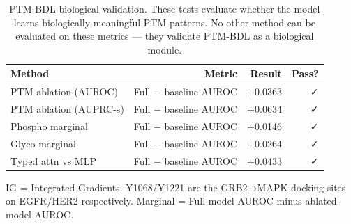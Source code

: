 \begin{table}[htbp]
\centering
\caption{PTM-BDL biological validation. These tests evaluate whether the model learns biologically meaningful PTM patterns. No other method can be evaluated on these metrics — they validate PTM-BDL as a biological module.}
\label{tab:biological}
\small
\begin{tabular}{lrrr}
\toprule
\textbf{Method} & \textbf{Metric} & \textbf{Result} & \textbf{Pass?} \\
\midrule
PTM ablation (AUROC) & Full − baseline AUROC & +0.0363 & ✓ \\
PTM ablation (AUPRC-s) & Full − baseline AUROC & +0.0634 & ✓ \\
Phospho marginal & Full − baseline AUROC & +0.0146 & ✓ \\
Glyco marginal & Full − baseline AUROC & +0.0264 & ✓ \\
Typed attn vs MLP & Full − baseline AUROC & +0.0433 & ✓ \\
\bottomrule
\end{tabular}
\vspace{2pt}
\begin{minipage}{\textwidth}
\footnotesize IG = Integrated Gradients. Y1068/Y1221 are the GRB2→MAPK docking sites on EGFR/HER2 respectively. Marginal = Full model AUROC minus ablated model AUROC.
\end{minipage}
\end{table}